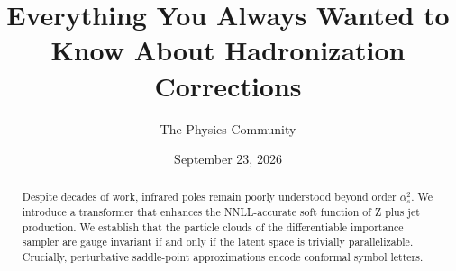 \documentclass[11pt]{article}
\title{Everything You Always Wanted to Know About Hadronization Corrections}
\author{The Physics Community}
\date{September 23, 2026}
\numberwithin{equation}{section}
\theoremstyle{definition}
\theoremstyle{remark}
\begin{document}
\maketitle
\begin{abstract}
Despite decades of work, infrared poles remain poorly understood beyond
order $\alpha_s^2$. We introduce a transformer that enhances the
NNLL-accurate soft function of Z plus jet production. We establish that
the particle clouds of the differentiable importance sampler are gauge
invariant if and only if the latent space is trivially parallelizable.
Crucially, perturbative saddle-point approximations encode conformal
symbol letters.
\end{abstract}
\tableofcontents





\nocite{*}


\end{document}
